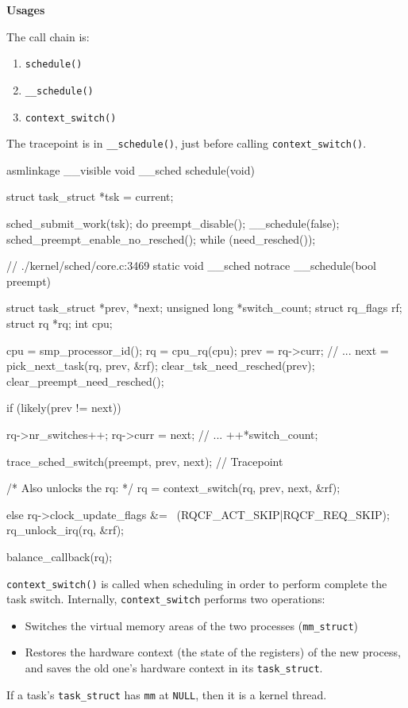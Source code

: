 \textbf{Usages}

The call chain is:
\begin{enumerate}
    \item \verb|schedule()|
    \item \verb|__schedule()|
    \item \verb|context_switch()|
\end{enumerate}
The tracepoint is in \verb|__schedule()|, just before calling \verb|context_switch()|.
\begin{code}
asmlinkage __visible void __sched schedule(void) {
	struct task_struct *tsk = current;

	sched_submit_work(tsk);
	do {
		preempt_disable();
		__schedule(false);
		sched_preempt_enable_no_resched();
	} while (need_resched());
}
\end{code}
\begin{code}
// ./kernel/sched/core.c:3469
static void __sched notrace __schedule(bool preempt) {
	struct task_struct *prev, *next;
	unsigned long *switch_count;
	struct rq_flags rf;
	struct rq *rq;
	int cpu;

	cpu = smp_processor_id();
	rq = cpu_rq(cpu);
	prev = rq->curr;
        // ...
	next = pick_next_task(rq, prev, &rf);
	clear_tsk_need_resched(prev);
	clear_preempt_need_resched();

	if (likely(prev != next)) {
		rq->nr_switches++;
		rq->curr = next;
                // ...
		++*switch_count;

		trace_sched_switch(preempt, prev, next); // Tracepoint

		/* Also unlocks the rq: */
		rq = context_switch(rq, prev, next, &rf);
	} else {
		rq->clock_update_flags &= ~(RQCF_ACT_SKIP|RQCF_REQ_SKIP);
		rq_unlock_irq(rq, &rf);
	}

	balance_callback(rq);
}
\end{code}
\verb|context_switch()| is called when scheduling in order to perform complete the task switch. 
Internally, \verb|context_switch| performs two operations:
\begin{itemize}
    \item Switches the virtual memory areas of the two processes (\verb|mm_struct|)
    \item Restores the hardware context (the state of the registers) of the new process, and saves the old one's hardware context in its \verb|task_struct|.
\end{itemize}
If a task's \verb|task_struct| has \verb|mm| at \verb|NULL|, then it is a kernel thread.\label{sec:context_switch}
